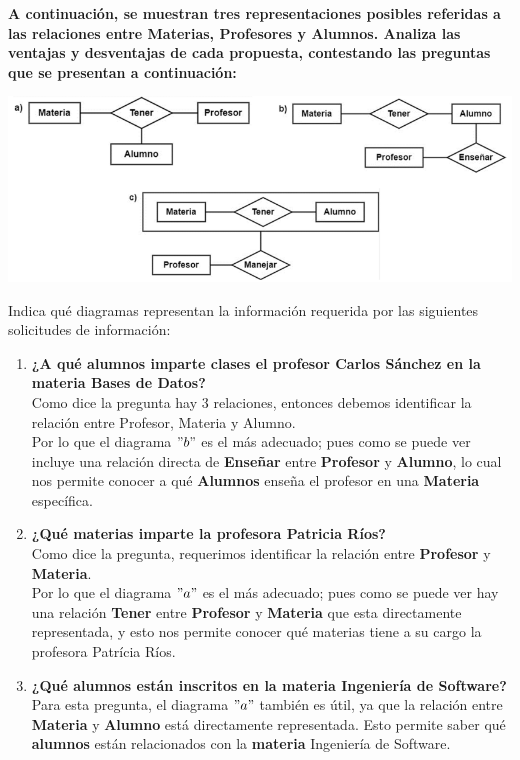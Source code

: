 \textbf{A continuación, se muestran tres representaciones posibles referidas a las relaciones entre Materias, Profesores y Alumnos. Analiza las ventajas y desventajas de cada propuesta, contestando las preguntas que se presentan a continuación:}

\begin{center}
    \includegraphics[width=16cm]{resources/ER_2.1.png}
\end{center}

Indica qué diagramas representan la información requerida por las siguientes solicitudes de información:

\begin{enumerate}
    \item \textbf{¿A qué alumnos imparte clases el profesor Carlos Sánchez en la materia Bases de Datos?} \\

    Como dice la pregunta hay 3 relaciones, entonces debemos identificar la relación entre Profesor, Materia y Alumno. \\

    Por lo que el diagrama \textbf{$"b"$} es el más adecuado; pues como se puede ver incluye una relación directa de \textbf{Enseñar} entre \textbf{Profesor} y \textbf{Alumno}, lo cual nos permite conocer a qué \textbf{Alumnos} enseña el profesor en una \textbf{Materia} específica. \\

    \item \textbf{¿Qué materias imparte la profesora Patricia Ríos?} \\

    Como dice la pregunta, requerimos identificar la relación entre \textbf{Profesor} y \textbf{Materia}. \\

    Por lo que el diagrama \textbf{$"a"$} es el más adecuado; pues como se puede ver hay una relación \textbf{Tener} entre \textbf{Profesor} y \textbf{Materia} que esta directamente representada, y esto nos permite conocer qué materias tiene a su cargo la profesora Patrícia Ríos. \\
    
    \item \textbf{¿Qué alumnos están inscritos en la materia Ingeniería de Software?} \\

    Para esta pregunta, el diagrama \textbf{$"a"$} también es útil, ya que la relación entre \textbf{Materia} y \textbf{Alumno} está directamente representada. Esto permite saber qué \textbf{alumnos} están relacionados con la \textbf{materia} Ingeniería de Software.
    
\end{enumerate}

